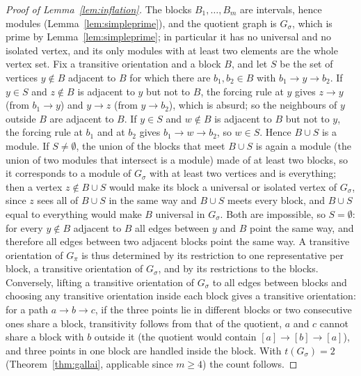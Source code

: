 \documentclass[11pt,a4paper]{article}
\theoremstyle{plain}
\theoremstyle{definition}
\theoremstyle{remark}
\begin{document}
\begin{proof}[Proof of Lemma~\ref{lem:inflation}]
The blocks $B_1,\dots,B_m$ are intervals, hence modules (Lemma~\ref{lem:simpleprime}), and the quotient graph is $G_\sigma$, which is prime by Lemma~\ref{lem:simpleprime}; in particular it has no universal and no isolated vertex, and its only modules with at least two elements are the whole vertex set. Fix a transitive orientation and a block $B$, and let $S$ be the set of vertices $y\notin B$ adjacent to $B$ for which there are $b_1,b_2\in B$ with $b_1\to y\to b_2$. If $y\in S$ and $z\notin B$ is adjacent to $y$ but not to $B$, the forcing rule at $y$ gives $z\to y$ (from $b_1\to y$) and $y\to z$ (from $y\to b_2$), which is absurd; so the neighbours of $y$ outside $B$ are adjacent to $B$. If $y\in S$ and $w\notin B$ is adjacent to $B$ but not to $y$, the forcing rule at $b_1$ and at $b_2$ gives $b_1\to w\to b_2$, so $w\in S$. Hence $B\cup S$ is a module. If $S\ne\emptyset$, the union of the blocks that meet $B\cup S$ is again a module (the union of two modules that intersect is a module) made of at least two blocks, so it corresponds to a module of $G_\sigma$ with at least two vertices and is everything; then a vertex $z\notin B\cup S$ would make its block a universal or isolated vertex of $G_\sigma$, since $z$ sees all of $B\cup S$ in the same way and $B\cup S$ meets every block, and $B\cup S$ equal to everything would make $B$ universal in $G_\sigma$. Both are impossible, so $S=\emptyset$: for every $y\notin B$ adjacent to $B$ all edges between $y$ and $B$ point the same way, and therefore all edges between two adjacent blocks point the same way. A transitive orientation of $G_\pi$ is thus determined by its restriction to one representative per block, a transitive orientation of $G_\sigma$, and by its restrictions to the blocks. Conversely, lifting a transitive orientation of $G_\sigma$ to all edges between blocks and choosing any transitive orientation inside each block gives a transitive orientation: for a path $a\to b\to c$, if the three points lie in different blocks or two consecutive ones share a block, transitivity follows from that of the quotient, $a$ and $c$ cannot share a block with $b$ outside it (the quotient would contain $[a]\to[b]\to[a]$), and three points in one block are handled inside the block. With $t(G_\sigma)=2$ (Theorem~\ref{thm:gallai}, applicable since $m\ge4$) the count follows.
\end{proof}
\end{document}

